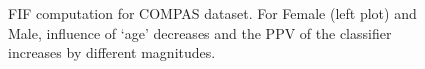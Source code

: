 \begin{figure}[t!]	
	\centering
	\vspace{-2ex}
	\caption{\footnotesize FIF computation for COMPAS dataset. For Female (left plot) and Male, influence of `age' decreases and the PPV of the classifier increases  by different magnitudes.}\label{fairness_fvgm_fig:influence function}
\end{figure}




